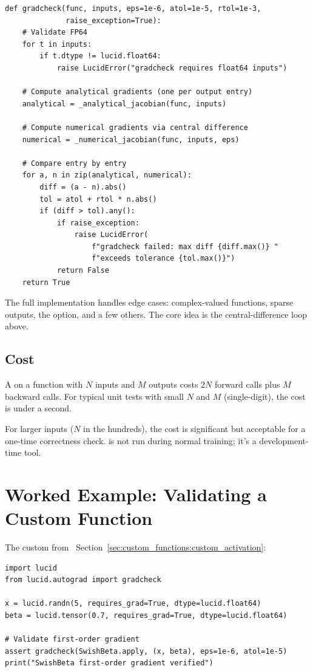 \begin{lstlisting}[style=lucid,language=LucidPython]
def gradcheck(func, inputs, eps=1e-6, atol=1e-5, rtol=1e-3,
              raise_exception=True):
    # Validate FP64
    for t in inputs:
        if t.dtype != lucid.float64:
            raise LucidError("gradcheck requires float64 inputs")

    # Compute analytical gradients (one per output entry)
    analytical = _analytical_jacobian(func, inputs)

    # Compute numerical gradients via central difference
    numerical = _numerical_jacobian(func, inputs, eps)

    # Compare entry by entry
    for a, n in zip(analytical, numerical):
        diff = (a - n).abs()
        tol = atol + rtol * n.abs()
        if (diff > tol).any():
            if raise_exception:
                raise LucidError(
                    f"gradcheck failed: max diff {diff.max()} "
                    f"exceeds tolerance {tol.max()}")
            return False
    return True
\end{lstlisting}

The full implementation handles edge cases: complex-valued
functions, sparse outputs, the 
option, and a few others. The core idea is the central-difference
loop above.

\subsection{Cost}
\label{ssec:gradcheck:cost}

A  on a function with $N$ inputs and $M$ outputs
costs $2N$ forward calls plus $M$ backward calls. For typical
unit tests with small $N$ and $M$ (single-digit), the cost is
under a second.

For larger inputs ($N$ in the hundreds), the cost is significant
but acceptable for a one-time correctness check. 
is not run during normal training; it's a development-time tool.

\section{Worked Example: Validating a Custom Function}
\label{sec:gradcheck:worked}

The custom  from
~Section~\ref{sec:custom_functions:custom_activation}:

\begin{lstlisting}[style=lucid,language=LucidPython]
import lucid
from lucid.autograd import gradcheck

x = lucid.randn(5, requires_grad=True, dtype=lucid.float64)
beta = lucid.tensor(0.7, requires_grad=True, dtype=lucid.float64)

# Validate first-order gradient
assert gradcheck(SwishBeta.apply, (x, beta), eps=1e-6, atol=1e-5)
print("SwishBeta first-order gradient verified")
\end{lstlisting}

